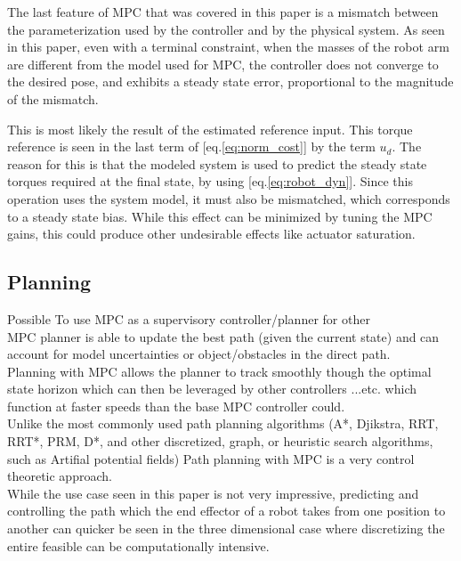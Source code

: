 \documentclass[journal]{IEEEtran}
\begin{document}
The last feature of MPC that was covered in this paper is a mismatch between the parameterization used by the controller and by the physical system. As seen in this paper, even with a terminal constraint, when the masses of the robot arm are different from the model used for MPC, the controller does not converge to the desired pose, and exhibits a steady state error, proportional to the magnitude of the mismatch.

This is most likely the result of the estimated reference input. This torque reference is seen in the last term of [eq.\ref{eq:norm_cost}] by the term $u_d$. The reason for this is that the modeled system is used to predict the steady state torques required at the final state, by using [eq.\ref{eq:robot_dyn}]. Since this operation uses the system model, it must also be mismatched, which corresponds to a steady state bias. While this effect can be minimized by tuning the MPC gains, this could produce other undesirable effects like actuator saturation.


\subsection{Planning}

Possible To use MPC as a supervisory controller/planner for other\\

MPC planner is able to update the best path (given the current state) and can account for model uncertainties or object/obstacles in the direct path.\\

Planning with MPC allows the planner to track smoothly though the optimal state horizon which can then be leveraged by other controllers ...etc. which function at faster speeds than the base MPC controller could.\\

Unlike the most commonly used path planning algorithms (A*, Djikstra, RRT, RRT*, PRM, D*, and other discretized, graph, or heuristic search algorithms, such as Artifial potential fields) Path planning with MPC is a very control theoretic approach.\\

While the use case seen in this paper is not very impressive, predicting and controlling the path which the end effector of a robot takes from one position to another can quicker be seen in the three dimensional case where discretizing the entire feasible can be computationally intensive.\\
\end{document}
